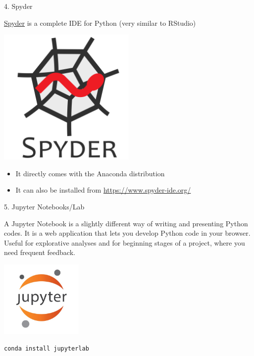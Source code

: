 
\begin{vbframe}{4. Spyder}

\vfill

\href{https://www.spyder-ide.org}{Spyder} is a complete IDE for Python (very similar to RStudio)

\centering
\includegraphics[width=0.5\textwidth]{figure/spyder.png}

\begin{itemize}
	\item It directly comes with the Anaconda distribution
	\item It can also be installed from \url{https://www.spyder-ide.org/}
\end{itemize}

\vfill

\end{vbframe}


\begin{vbframe}{5. Jupyter Notebooks/Lab}

\vfill

A Jupyter Notebook is a slightly different way of writing and presenting Python codes. It is a web application that lets you develop Python code in your browser.\\
Useful for explorative analyses and for beginning stages of a project, where you need frequent feedback.

\centering
\includegraphics[width=0.3\textwidth]{figure/jupyter.jpg}

\begin{lstlisting}[language=bash]
conda install jupyterlab
\end{lstlisting}

\vfill

\end{vbframe}

